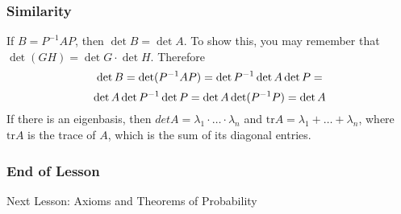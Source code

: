 \documentclass[xcolor=dvipsnames]{beamer}
\begin{document}
\begin{frame}
  \frametitle{Similarity}
  If $B=P^{-1}AP$, then $\det{}B=\det{}A$. To show this, you may
  remember that $\det{}(GH)=\det{}G\cdot\det{}H$. Therefore
  \begin{equation}
    \label{eq:taichahh}
    \det{}B=\det(P^{-1}AP)=\det{}P^{-1}\det{}A\det{}P=\notag
  \end{equation}
  \begin{equation}
    \label{eq:ielaemiy}
    \det{}A\det{}P^{-1}\det{}P=\det{}A\det(P^{-1}P)=\det{}A\notag
  \end{equation}
  If there is an eigenbasis, then
  $det{}A=\lambda_{1}\cdot\ldots\cdot\lambda_{n}$ and
  $\mbox{tr}A=\lambda_{1}+\ldots+\lambda_{n}$, where $\mbox{tr}A$ is
  the \alert{trace} of $A$, which is the sum of its diagonal entries.
\end{frame}

\begin{frame}
  \frametitle{End of Lesson}
Next Lesson: Axioms and Theorems of Probability
\end{frame}
\end{document}
